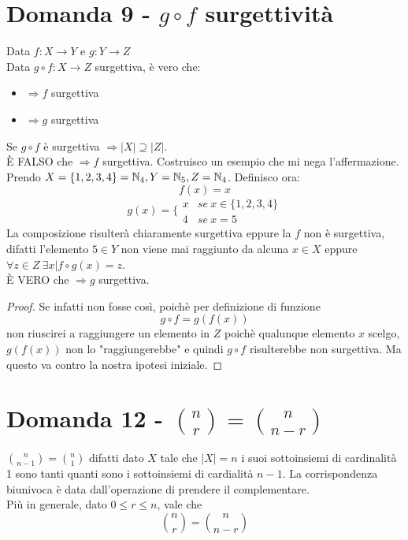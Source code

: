 \documentclass[]{article}
\begin{document}
\section{Domanda 9 - $g\circ f$ surgettività}
Data $f:X \rightarrow Y$ e $g: Y \rightarrow Z$\\
Data $g\circ f: X \rightarrow Z$ surgettiva, è vero che:
\begin{itemize}
\item $\Rightarrow f$ surgettiva
\item $\Rightarrow g$ surgettiva
\end{itemize}
Se $g \circ f$ è surgettiva $\Rightarrow |X| \supseteq |Z|$.\\
È FALSO che $\Rightarrow f$ surgettiva. Costruisco un esempio che mi nega l'affermazione.\\
Prendo $X = \{1,2,3,4\} = \mathbb{N}_4, Y = \mathbb{N}_5, Z = \mathbb{N}_4$.
Definisco ora: 
$$f(x) = x$$
$$g(x) = \bigg \{ 
\begin{array}{lr}
x & se\ x \in \{1,2,3,4\}\\
4 & se\ x = 5
\end{array}
$$
La composizione risulterà chiaramente surgettiva eppure la $f$ non è surgettiva, difatti l'elemento $5 \in Y$ non viene mai raggiunto da alcuna $x \in X$ eppure $\forall z \in Z\  \exists x | f\circ g(x)=z$.\\
È VERO che $\Rightarrow g$ surgettiva. 
\begin{proof}Se infatti non fosse così, poichè per definizione di funzione $$g \circ f = g(f(x))$$ non riuscirei a raggiungere un elemento in $Z$ poichè qualunque elemento $x$ scelgo, $g(f(x))$ non lo "raggiungerebbe" e quindi $g \circ f$ risulterebbe non surgettiva. Ma questo va contro la nostra ipotesi iniziale.\end{proof}
\section{Domanda 12 - ${n \choose r} = {n \choose n-r}$}
${n \choose n-1} = {n \choose 1} $ difatti dato $ X $ tale che $ |X| = n $ i suoi sottoinsiemi di cardinalità 1 sono tanti quanti sono i sottoinsiemi di cardialità $n-1$. La corrispondenza biunivoca è data dall'operazione di prendere il complementare.\\
Più in generale, dato $0\leqslant r \leqslant n$, vale che $${n \choose r} = {n \choose n-r}$$
\end{document}
